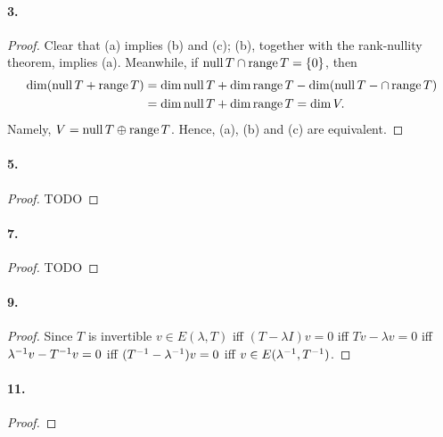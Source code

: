   \paragraph{3.}
  \begin{proof}
    Clear that (a) implies (b) and (c); (b), together with the rank-nullity 
    theorem, implies (a). Meanwhile, if $\operatorname{null} T\cap\operatorname{range} T=\{0\}$, then 
    \begin{align*}
      \dim(\operatorname{null} T+\operatorname{range} T) 
      &= \dim\operatorname{null} T+\dim\operatorname{range} T-\dim(\operatorname{null} T-\cap\operatorname{range} T) \\
      &= \dim\operatorname{null} T+\dim\operatorname{range} T = \dim V.    
    \end{align*}
    Namely, $V=\operatorname{null} T\oplus\operatorname{range} T$. Hence, (a), (b) and (c) are equivalent.
    

  \end{proof}

  \paragraph{5.}
  \begin{proof}
    TODO
  \end{proof}

  \paragraph{7.}
  \begin{proof}
    TODO
  \end{proof}

  \paragraph{9.}
  \begin{proof}
    Since $T$ is invertible $v\in E(\lambda, T)$ iff $(T-\lambda I)v=0$ iff $Tv
    -\lambda v = 0$ iff $\lambda^{-1} v - T^{-1} v = 0$ iff $(T^{-1}-\lambda^{-1})v
    =0$ iff $v\in E(\lambda^{-1}, T^{-1})$.
  \end{proof}

  \paragraph{11.}
  \begin{proof}
    
  \end{proof}

\fi
